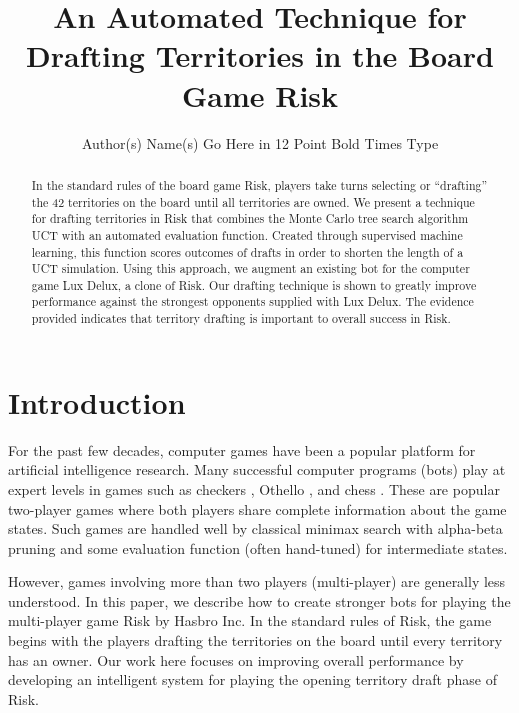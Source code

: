 \documentclass[letterpaper]{article}
\title{An Automated Technique for Drafting Territories in the Board Game Risk%
}
\author{Author(s) Name(s) Go Here in 12 Point Bold Times Type}
\numberwithin{equation}{section}
\numberwithin{theorem}{section}
\numberwithin{lemma}{section}
\numberwithin{df}{section}
\begin{document}
\maketitle

\begin{abstract}
In the standard rules of the board game Risk, players take turns selecting or ``drafting'' the 42 territories on the board until all territories are owned.  We present a technique for drafting territories in Risk that combines the Monte Carlo tree search algorithm UCT with an automated evaluation function.  Created through supervised machine learning, this function scores outcomes of drafts in order to shorten the length of a UCT simulation.  Using this approach, we augment an existing bot for the computer game Lux Delux, a clone of Risk.  Our drafting technique is shown to greatly improve performance against the strongest opponents supplied with Lux Delux.  The evidence provided indicates that territory drafting is important to overall success in Risk.
\end{abstract}

\section{Introduction}


For the past few decades, computer games have been a popular platform for artificial intelligence research.  Many successful computer programs (bots) play at expert levels in games such as checkers \cite{Chinook}, Othello \cite{Othello}, and
chess \cite{DeepBlue}.  These are popular two-player games where both players share complete information about the game states.  Such games are handled well by classical minimax search with alpha-beta pruning and some evaluation function (often hand-tuned) for intermediate states.  

However, games involving more than two players (multi-player) are generally less understood.  In this paper, we describe how to create stronger bots for playing the multi-player game Risk by Hasbro Inc.  In the standard rules of Risk, the game begins with the players drafting the territories on the board until every territory has an owner.  Our work here focuses on improving overall performance by developing an intelligent system for playing the opening territory draft phase of Risk.
\end{document}
